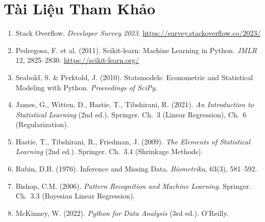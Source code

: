 \section{Tài Liệu Tham Khảo}

\begin{enumerate}
    \item Stack Overflow. \textit{Developer Survey 2023}.
        \url{https://survey.stackoverflow.co/2023/}

    \item Pedregosa, F. et al. (2011). Scikit-learn: Machine Learning in Python.
        \textit{JMLR} 12, 2825--2830. \url{https://scikit-learn.org/}

    \item Seabold, S. \& Perktold, J. (2010). Statsmodels: Econometric and Statistical
        Modeling with Python. \textit{Proceedings of SciPy}.

    \item James, G., Witten, D., Hastie, T., Tibshirani, R. (2021).
        \textit{An Introduction to Statistical Learning} (2nd ed.). Springer.
        Ch.\ 3 (Linear Regression), Ch.\ 6 (Regularization).

    \item Hastie, T., Tibshirani, R., Friedman, J. (2009).
        \textit{The Elements of Statistical Learning} (2nd ed.). Springer.
        Ch.\ 3.4 (Shrinkage Methods).

    \item Rubin, D.B. (1976). Inference and Missing Data.
        \textit{Biometrika}, 63(3), 581--592.

    \item Bishop, C.M. (2006).
        \textit{Pattern Recognition and Machine Learning}. Springer.
        Ch.\ 3.3 (Bayesian Linear Regression).

    \item McKinney, W. (2022).
        \textit{Python for Data Analysis} (3rd ed.). O'Reilly.
\end{enumerate}